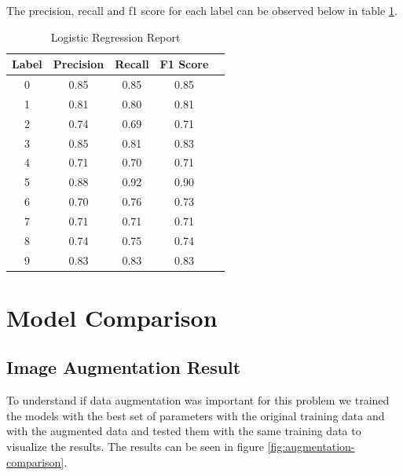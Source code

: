 \documentclass[conference]{IEEEtran}
\begin{document}
The precision, recall and f1 score for each label can be observed below in table \ref{tab:lg-classification-report}.

\begin{table}[!h]
    \centering
    \begin{tabular}{|c|c|c|c|r|}
        \hline
        \textbf{Label} & \textbf{Precision} & \textbf{Recall} & \textbf{F1 Score} \\ \hline
        0              & 0.85               & 0.85            & 0.85              \\ \hline
        1              & 0.81               & 0.80            & 0.81              \\ \hline
        2              & 0.74               & 0.69            & 0.71              \\ \hline
        3              & 0.85               & 0.81            & 0.83              \\ \hline
        4              & 0.71               & 0.70            & 0.71              \\ \hline
        5              & 0.88               & 0.92            & 0.90              \\ \hline
        6              & 0.70               & 0.76            & 0.73              \\ \hline
        7              & 0.71               & 0.71            & 0.71              \\ \hline
        8              & 0.74               & 0.75            & 0.74              \\ \hline
        9              & 0.83               & 0.83            & 0.83              \\ \hline
    \end{tabular}
    
    \caption{Logistic Regression Report \label{tab:lg-classification-report}}
\end{table}

\section{Model Comparison}

\subsection{Image Augmentation Result}
To understand if data augmentation was important for this problem we trained the models with the best set of parameters with the original training data
and with the augmented data and tested them with the same training data to visualize the results. The results can be seen in figure \ref{fig:augmentation-comparison}.
\end{document}
